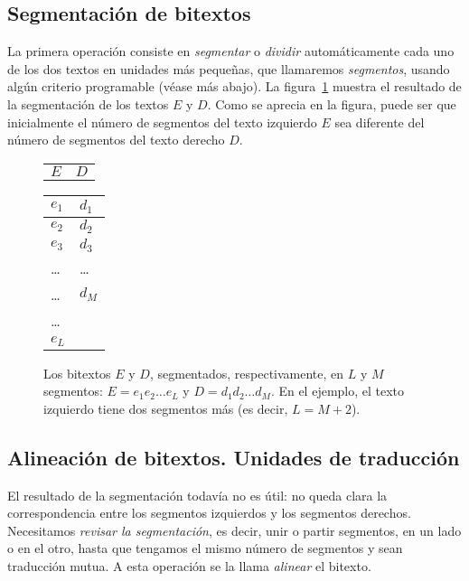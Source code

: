 \subsection{Segmentación de bitextos} La primera operación consiste en \emph{segmentar} o \emph{dividir} automáticamente cada uno de los dos textos en unidades más pequeñas, que llamaremos \emph{segmentos}, usando algún criterio programable (véase más abajo). La figura~\ref{fg:segmentat} muestra el resultado de la segmentación de los textos $E$ y $D$. Como se aprecia en la figura, puede ser que inicialmente el número de segmentos del texto izquierdo $E$ sea diferente del número de segmentos del texto derecho $D$. \begin{figure} \begin{center} \begin{tabular}{p{3cm}p{3cm}} $E$ &$D$ \end{tabular} \begin{tabular}{|p{3cm}|p{3cm}|} \hline

$e_1$ &$d_1$ \\\hline $e_2$ &$d_2$ \\\hline $e_3$ &$d_3$ \\\hline \ldots &\ldots \\\hline \ldots &$d_M$ \\\hline \ldots \\\cline{1-1} $e_L$ \\\cline{1-1} \end{tabular} \end{center} \caption{Los bitextos $E$ y $D$, segmentados, respectivamente, en $L$ y $M$ segmentos: $E=e_1e_2\ldots e_L$ y $D=d_1d_2\ldots d_M$. En el ejemplo, el texto izquierdo tiene dos segmentos más (es decir, $L=M+2$).} \label{fg:segmentat} \end{figure} 

\subsection{Alineación de bitextos. Unidades de traducción} 

El resultado de la segmentación todavía no es útil: no queda clara la correspondencia entre los segmentos izquierdos y los segmentos derechos. Necesitamos \emph{revisar la segmentación}, es decir, unir o partir segmentos, en un lado o en el otro, hasta que tengamos el mismo número de segmentos y sean traducción mutua. A esta operación se la llama \emph{alinear} el bitexto. 

